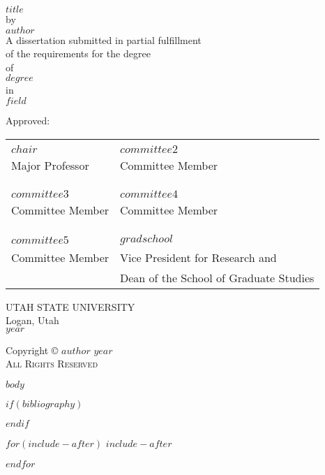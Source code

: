 \documentclass{DissertateUSU}
\renewcommand{\maketitle}{
	\thispagestyle{empty}
	\vspace*{\fill}
	\begin{center}
	\doublespaced
	\MakeUppercase{$title$}\\
	by\\
	$author$ \\
	\singlespaced
	A dissertation submitted in partial fulfillment\\
	of the requirements for the degree \\
	\doublespaced
	of\\
	\MakeUppercase{$degree$} \\
	in\\
	\singlespaced
  $field$ \\
	\end{center}
	\vspace{12pt}
	\noindent Approved: \\
	\vspace{20pt}
	\begin{tabular}{ll}
	  \centering
    \makebox[2.75in]{\hrulefill} & \makebox[2.7in]{\hrulefill}\\
    $chair$                      & $committee2$ \\
    Major Professor              & Committee Member \\
    & \\
    & \\
    \makebox[2.75in]{\hrulefill} & \makebox[2.75in]{\hrulefill}\\
    $committee3$                 & $committee4$ \\
    Committee Member             & Committee Member \\
    & \\
    & \\
    \makebox[2.75in]{\hrulefill} & \makebox[2.75in]{\hrulefill}\\
    $committee5$                 & $gradschool$ \\
    Committee Member             & Vice President for Research and \\
                                 & Dean of the School of Graduate Studies \\
    \end{tabular}
  \vspace{10pt}
    \begin{center}
	  \singlespacing
      UTAH STATE UNIVERSITY\\
	    Logan, Utah\\
	    \doublespacing
	    $year$
	  \end{center}
	\vspace*{\fill}
	\clearpage
}
\newcommand{\copyrightpage}{
	\vspace*{\fill}
  \begin{center}
	\doublespacing
	Copyright \hspace{3pt}
	  \scshape \small \copyright  \hspace{3pt}
	  $author$ \hspace{3pt} $year$ \\
	All Rights Reserved
  \end{center}
	\vspace*{\fill}
}
\begin{document}
\maketitle

\pagestyle{empty}
\copyrightpage


$body$

$if(bibliography)$


$endif$

$for(include-after)$
$include-after$

$endfor$
\end{document}
